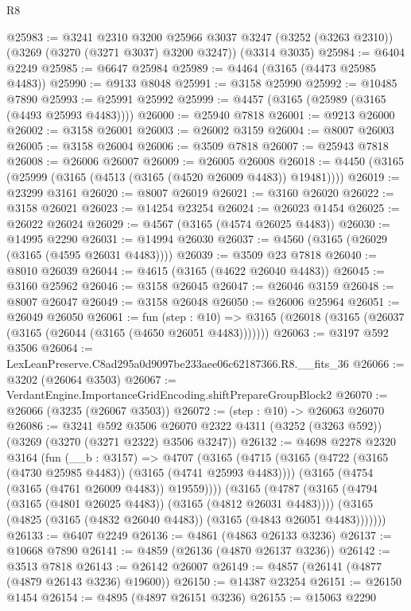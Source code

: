 \begin{lexlean}{R8}
\begin{coremodule}
@25983 := @3241
    @2310
    @3200
    @25966
    @3037
    @3247
    (@3252 (@3263 @2310))
    (@3269 (@3270 (@3271 @3037) @3200 @3247))
    (@3314 @3035)
@25984 := @6404 @2249
@25985 := @6647 @25984
@25989 := @4464 (@3165 (@4473 @25985 @4483))
@25990 := @9133 @8048
@25991 := @3158 @25990
@25992 := @10485 @7890
@25993 := @25991 @25992
@25999 := @4457 (@3165 (@25989 (@3165 (@4493 @25993 @4483))))
@26000 := @25940 @7818
@26001 := @9213 @26000
@26002 := @3158 @26001
@26003 := @26002 @3159
@26004 := @8007 @26003
@26005 := @3158 @26004
@26006 := @3509 @7818
@26007 := @25943 @7818
@26008 := @26006 @26007
@26009 := @26005 @26008
@26018 := @4450 (@3165 (@25999 (@3165 (@4513 (@3165 (@4520 @26009 @4483)) @19481))))
@26019 := @23299 @3161
@26020 := @8007 @26019
@26021 := @3160 @26020
@26022 := @3158 @26021
@26023 := @14254 @23254
@26024 := @26023 @1454
@26025 := @26022 @26024
@26029 := @4567 (@3165 (@4574 @26025 @4483))
@26030 := @14995 @2290
@26031 := @14994 @26030
@26037 := @4560 (@3165 (@26029 (@3165 (@4595 @26031 @4483))))
@26039 := @3509 @23 @7818
@26040 := @8010 @26039
@26044 := @4615 (@3165 (@4622 @26040 @4483))
@26045 := @3160 @25962
@26046 := @3158 @26045
@26047 := @26046 @3159
@26048 := @8007 @26047
@26049 := @3158 @26048
@26050 := @26006 @25964
@26051 := @26049 @26050
@26061 := fun (step : @10) =>
  @3165 (@26018 (@3165 (@26037 (@3165 (@26044 (@3165 (@4650 @26051 @4483)))))))
@26063 := @3197 @592 @3506
@26064 := LexLeanPreserve.C8ad295a0d9097be233aee06c62187366.R8.__fits_36
@26066 := @3202 (@26064 @3503)
@26067 := VerdantEngine.ImportanceGridEncoding.shiftPrepareGroupBlock2
@26070 := @26066 (@3235 (@26067 @3503))
@26072 := (step : @10) -> @26063 @26070
@26086 := @3241
    @592
    @3506
    @26070
    @2322
    @4311
    (@3252 (@3263 @592))
    (@3269 (@3270 (@3271 @2322) @3506 @3247))
@26132 := @4698
    @2278
    @2320
    @3164
    (fun (__b : @3157) =>
    @4707
      (@3165
        (@4715
          (@3165 (@4722 (@3165 (@4730 @25985 @4483)) (@3165 (@4741 @25993 @4483))))
          (@3165 (@4754 (@3165 (@4761 @26009 @4483)) @19559))))
      (@3165
        (@4787
          (@3165 (@4794 (@3165 (@4801 @26025 @4483)) (@3165 (@4812 @26031 @4483))))
          (@3165 (@4825 (@3165 (@4832 @26040 @4483)) (@3165 (@4843 @26051 @4483)))))))
@26133 := @6407 @2249
@26136 := @4861 (@4863 @26133 @3236)
@26137 := @10668 @7890
@26141 := @4859 (@26136 (@4870 @26137 @3236))
@26142 := @3513 @7818
@26143 := @26142 @26007
@26149 := @4857 (@26141 (@4877 (@4879 @26143 @3236) @19600))
@26150 := @14387 @23254
@26151 := @26150 @1454
@26154 := @4895 (@4897 @26151 @3236)
@26155 := @15063 @2290

\end{coremodule}
\end{lexlean}
